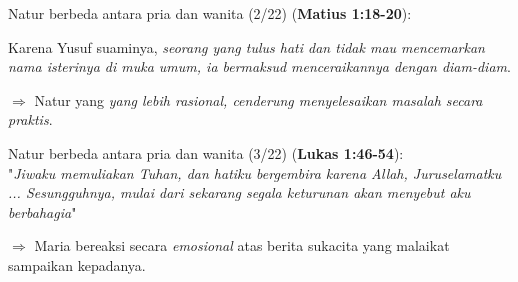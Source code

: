 \documentclass{beamer}
\theoremstyle{mystyle}
\let\emph\relax %
\begin{document}
\begin{frame}{Natur berbeda antara pria dan wanita (2/22)}
\emph{Yusuf} (\textbf{Matius 1:18-20}): 

	 Karena Yusuf suaminya, \textit{seorang yang tulus hati dan tidak mau mencemarkan nama isterinya di muka umum, ia bermaksud menceraikannya dengan diam-diam}.
	
	\bigskip
	 $\Longrightarrow$ Natur yang \textit{yang lebih rasional, cenderung menyelesaikan masalah secara praktis}.

\end{frame}

\begin{frame}{Natur berbeda antara pria dan wanita (3/22)}
\emph{Maria} (\textbf{Lukas 1:46-54}): \\
	\onslide<2-> "\textit{Jiwaku memuliakan Tuhan, dan hatiku bergembira karena Allah, Juruselamatku ... Sesungguhnya, mulai dari sekarang segala keturunan akan menyebut aku berbahagia}"
	
	\bigskip
	 $\Longrightarrow$ Maria bereaksi secara \textit{emosional} atas berita sukacita yang malaikat sampaikan kepadanya.
\end{frame}

%		
%		
%
%
%		
\end{document}
